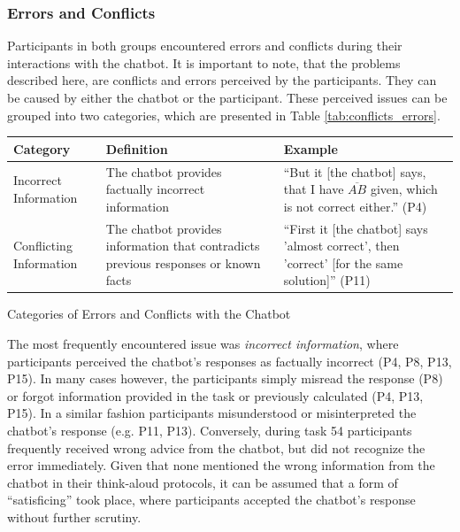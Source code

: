 \subsubsection{Errors and Conflicts} \label{sssec:errors_conflicts}

Participants in both groups encountered errors and conflicts during their interactions with the chatbot. It is important to note, that the problems described here, are conflicts and errors perceived by the participants. They can be caused by either the chatbot or the participant. These perceived issues can be grouped into two categories, which are presented in Table \ref{tab:conflicts_errors}.


\begin{ctable}
    \begin{tabularx}{\textwidth}{l|X|X}
        \textbf{Category} & \textbf{Definition} & \textbf{Example} \\
        \hline
        Incorrect Information & The chatbot provides factually incorrect information & “But it [the chatbot] says, that I have $\overline{AB}$ given, which is not correct either.” (P4) \\
        Conflicting Information & The chatbot provides information that contradicts previous responses or known facts & “First it [the chatbot] says 'almost correct', then 'correct' [for the same solution]” (P11) \\
    \end{tabularx}
    \caption{Categories of Errors and Conflicts with the Chatbot}
    \label{tab:conflicts_errors}
\end{ctable}

The most frequently encountered issue was \textit{incorrect information}, where participants perceived the chatbot's responses as factually incorrect (P4, P8, P13, P15). In many cases however, the participants simply misread the response (P8) or forgot information provided in the task or previously calculated (P4, P13, P15). In a similar fashion participants misunderstood or misinterpreted the chatbot's response (e.g. P11, P13). Conversely, during task 54 participants frequently received wrong advice from the chatbot, but did not recognize the error immediately. Given that none mentioned the wrong information from the chatbot in their think-aloud protocols, it can be assumed that a form of “satisficing” \parencite{Simon1955} took place, where participants accepted the chatbot's response without further scrutiny.

